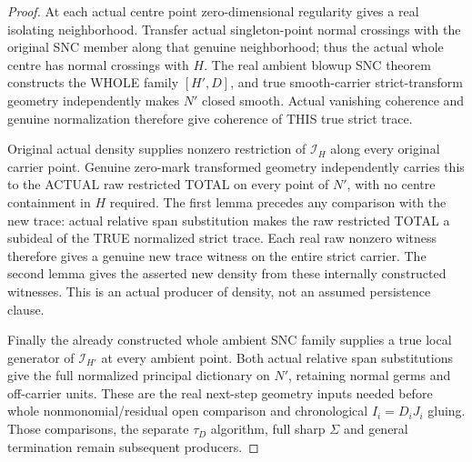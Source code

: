 \begin{proof}
At each actual centre point zero-dimensional regularity gives a real
isolating neighborhood. Transfer actual singleton-point normal crossings
with the original SNC member along that genuine neighborhood; thus the
actual whole centre has normal crossings with $H$. The real ambient
blowup SNC theorem constructs the WHOLE family $[H',D]$, and true
smooth-carrier strict-transform geometry independently makes $N'$ closed
smooth. Actual vanishing coherence and genuine normalization therefore
give coherence of THIS true strict trace.

Original actual density supplies nonzero restriction of $\mathcal I_H$
along every original carrier point. Genuine zero-mark transformed
geometry independently carries this to the ACTUAL raw restricted TOTAL
on every point of $N'$, with no centre containment in $H$ required.
The first lemma precedes any comparison with the new trace: actual
relative span substitution makes the raw restricted TOTAL a subideal
of the TRUE normalized strict trace. Each real raw nonzero witness
therefore gives a genuine new trace witness on the entire strict carrier.
The second lemma gives the asserted new density from these internally
constructed witnesses. This is an actual producer of density, not an
assumed persistence clause.

Finally the already constructed whole ambient SNC family supplies a
true local generator of $\mathcal I_{H'}$ at every ambient point.
Both actual relative span substitutions give the full normalized
principal dictionary on $N'$, retaining normal germs and off-carrier
units. These are the real next-step geometry inputs needed before
whole nonmonomial/residual open comparison and chronological
$I_i=D_iJ_i$ gluing. Those comparisons, the separate $\tau_D$ algorithm,
full sharp $\Sigma$ and general termination remain subsequent producers.
\end{proof}
